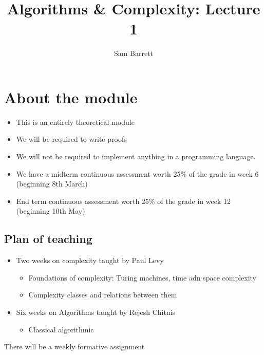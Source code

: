 \documentclass{article}
\title{Algorithms \& Complexity: Lecture 1}
\author{Sam Barrett}
\begin{document}
\maketitle

\section{About the module}

\begin{itemize}
\item This is an entirely theoretical module
  \item We will be required to write proofs
  \item We will not be required to implement anything in a programming language.
  \item We have a midterm continuous assessment worth 25\% of the grade in week 6 (beginning 8th March)
  \item End term continuous assessment worth 25\% of the grade in week 12 (beginning 10th May)
\end{itemize}

\subsection{Plan of teaching}

\begin{itemize}
  \item Two weeks on complexity taught by Paul Levy
        \begin{itemize}
          \item Foundations of complexity: Turing machines, time adn space complexity
          \item Complexity classes and relations between them
        \end{itemize}
  \item Six weeks on Algorithms taught by Rejesh Chitnis
        \begin{itemize}
\item Classical algorithmic
        \end{itemize}
\end{itemize}

There will be a weekly formative assignment
\end{document}
